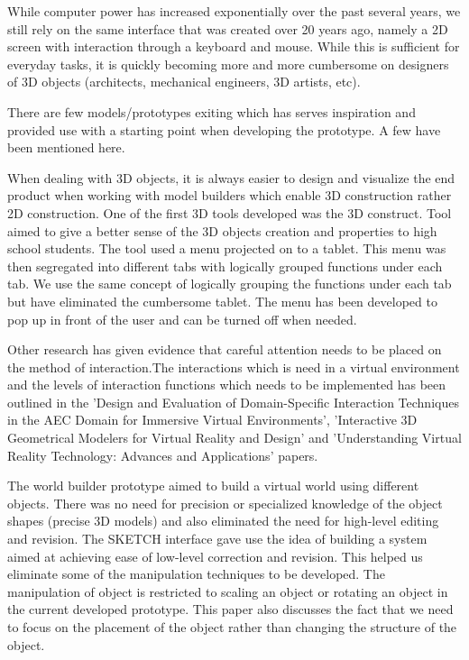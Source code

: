 While computer power has increased exponentially over the past several years, we still rely on the same interface that was created over 20 years ago, namely a 2D screen with interaction through a keyboard and mouse.
While this is sufficient for everyday tasks, it is quickly becoming more and more cumbersome on designers of 3D objects (architects, mechanical engineers, 3D artists, etc)\cite{Dekker199242}.

There are few models/prototypes exiting which has serves inspiration and provided use with a starting point when developing the prototype. A few have been mentioned here.

When dealing with 3D objects, it is always easier to design and visualize the end product when working with model builders which enable 3D construction rather 2D construction. One of the first 3D tools developed was the 3D construct\cite{Kaufmann:Usability}. Tool aimed to give a better sense of the 3D objects creation and properties to high school students\cite{Kaufmann:LearningGeometry}. The tool used a menu projected on to a tablet. This menu was then segregated into different tabs with logically grouped functions under each tab. We use the same concept of logically grouping the functions under each tab but have eliminated the cumbersome tablet. The menu has been developed to pop up in front of the user and can be turned off when needed. 

Other research has given evidence that careful attention needs to be placed on the method of interaction\cite{Bowman98interactiontechniques}.The interactions which is need in a virtual environment and the levels of interaction functions which needs to be implemented has been outlined in the 'Design and Evaluation of Domain-Specific Interaction Techniques in the AEC Domain for Immersive Virtual Environments'\cite{AEC}, 'Interactive 3D Geometrical Modelers for Virtual Reality and Design'\cite{Interactive} and 'Understanding Virtual Reality Technology: Advances and Applications' \cite{AdvanceAndApplication} papers. 

The world builder prototype aimed to build a virtual world using different objects. There was no need for precision or specialized knowledge of the object shapes (precise 3D models) and also eliminated the need for high-level editing and revision. The SKETCH\cite{SKETCH} interface gave use the idea of building a system aimed at achieving ease of low-level correction and revision. This helped us eliminate some of the manipulation techniques to be developed. The manipulation of object is restricted to scaling an object or rotating an object in the current developed prototype. This paper also discusses the fact that we need to focus on the placement of the object rather than changing the structure of the object.

